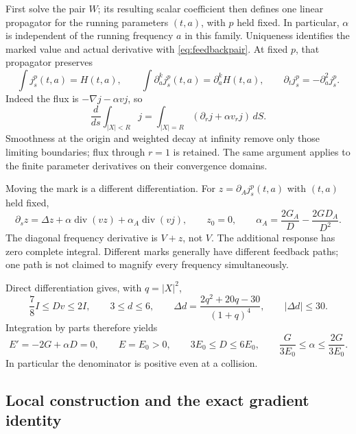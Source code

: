 \documentclass[11pt]{article}
\numberwithin{equation}{section}
\begin{document}
First solve the pair $W$; its resulting scalar coefficient then defines
one linear propagator for the running parameters $(t,a)$, with $p$
held fixed. In particular, $\alpha$ is independent of the running
frequency $a$ in this family. Uniqueness
identifies the marked value and actual derivative with
\eqref{eq:feedbackpair}. At fixed $p$, that propagator preserves
\begin{equation}\label{eq:feedbackobservations}
 \int j_s^p(t,a)=H(t,a),\qquad
 \int\partial_a^kj_s^p(t,a)=\partial_a^kH(t,a),\qquad
 \partial_tj_s^p=-\partial_a^2j_s^p.
\end{equation}
Indeed the flux is $-\nabla j-\alpha vj$, so
\[
 \frac{d}{ds}\int_{|X|<R}j
   =\int_{|X|=R}(\partial_rj+\alpha v_rj)\,dS.
\]
Smoothness at the origin and weighted decay at infinity remove only
those limiting boundaries; flux through $r=1$ is retained. The same
argument applies to the finite parameter derivatives on their
convergence domains.

Moving the mark is a different differentiation. For
$z=\partial_Aj_s^p(t,a)$ with $(t,a)$ held fixed,
\begin{equation}\label{eq:feedbackmarkresponse}
 \partial_sz=\Delta z+\alpha\operatorname{div}(vz)
               +\alpha_A\operatorname{div}(vj),\qquad z_0=0,
 \qquad \alpha_A=\frac{2G_A}{D}-\frac{2GD_A}{D^2}.
\end{equation}
The diagonal frequency derivative is $V+z$, not $V$. The additional
response has zero complete integral. Different marks generally have
different feedback paths; one path is not claimed to magnify every
frequency simultaneously.

Direct differentiation gives, with $q=|X|^2$,
\begin{equation}\label{eq:feedbackcoefficients}
 \frac78I\le Dv\le2I,\qquad 3\le d\le6,\qquad
 \Delta d=\frac{2q^2+20q-30}{(1+q)^4},\qquad |\Delta d|\le30.
\end{equation}
Integration by parts therefore yields
\begin{equation}\label{eq:feedbackenergy}
 E'=-2G+\alpha D=0,\qquad E=E_0>0,\qquad
 3E_0\le D\le6E_0,\qquad
 \frac{G}{3E_0}\le\alpha\le\frac{2G}{3E_0}.
\end{equation}
In particular the denominator is positive even at a collision.

\subsection{Local construction and the exact gradient identity}
\end{document}
